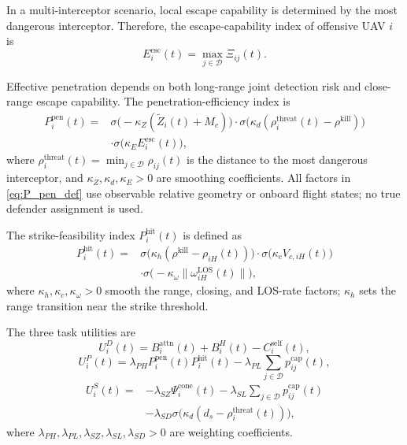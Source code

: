 \documentclass[unbranded]{cja}
\begin{document}
In a multi-interceptor scenario, local escape capability is determined by the most dangerous interceptor. Therefore, the escape-capability index of offensive UAV $i$ is
\begin{equation}
E_i^{\mathrm{esc}}(t)
=
\max_{j\in\mathcal{D}} \Xi_{ij}(t).
\end{equation}

Effective penetration depends on both long-range joint detection risk and close-range escape capability. The penetration-efficiency index is
\begin{equation}
\begin{aligned}
P_i^{\mathrm{pen}}(t)
={}&
\sigma\!\bigl(-\kappa_Z(\widetilde Z_i(t)+M_c)\bigr)
\cdot
\sigma\!\bigl(\kappa_d(\rho_i^{\mathrm{threat}}(t)-\rho^{\mathrm{kill}})\bigr)\\
&\cdot
\sigma\!\bigl(\kappa_E E_i^{\mathrm{esc}}(t)\bigr),
\end{aligned}
\label{eq:P_pen_def}
\end{equation}
where $\rho_i^{\mathrm{threat}}(t)=\min_{j\in\mathcal{D}}\rho_{ij}(t)$ is the distance to the most dangerous interceptor, and $\kappa_Z,\kappa_d,\kappa_E>0$ are smoothing coefficients. All factors in \eqref{eq:P_pen_def} use observable relative geometry or onboard flight states; no true defender assignment is used.

The strike-feasibility index $P_i^{\mathrm{hit}}(t)$ is defined as
\begin{equation}
\begin{aligned}
P_i^{\mathrm{hit}}(t)
={}&
\sigma\!\bigl(\kappa_h(\rho^{\mathrm{kill}}-\rho_{iH}(t))\bigr)
\cdot
\sigma\!\bigl(\kappa_c V_{c,iH}(t)\bigr)\\
&\cdot
\sigma\!\bigl(-\kappa_{\omega}\|\omega_{iH}^{\mathrm{LOS}}(t)\|\bigr),
\end{aligned}
\label{eq:P_hit_def}
\end{equation}
where $\kappa_h,\kappa_c,\kappa_{\omega}>0$ smooth the range, closing, and LOS-rate factors; $\kappa_h$ sets the range transition near the strike threshold.

The three task utilities are
\begin{equation}
U_i^{D}(t)
=B_i^{\mathrm{attn}}(t)+B_i^{H}(t)-C_i^{\mathrm{self}}(t),
\label{eq:role-utility-decoy}
\end{equation}
\begin{equation}
U_i^{P}(t)
=\lambda_{PH}P_i^{\mathrm{pen}}(t)P_i^{\mathrm{hit}}(t)
-\lambda_{PL}\sum_{j\in\mathcal D}p_{ij}^{\mathrm{cap}}(t),
\label{eq:role-utility-pen}
\end{equation}
\begin{equation}
\begin{aligned}
U_i^{S}(t)
={}&-\lambda_{SZ}\Psi_i^{\mathrm{cone}}(t)
-\lambda_{SL}\sum_{j\in\mathcal D}p_{ij}^{\mathrm{cap}}(t)\\
&-\lambda_{SD}\sigma\!\bigl(\kappa_d(d_s-\rho_i^{\mathrm{threat}}(t))\bigr),
\end{aligned}
\label{eq:role-utility-stealth}
\end{equation}
where $\lambda_{PH},\lambda_{PL},\lambda_{SZ},\lambda_{SL},\lambda_{SD}>0$ are weighting coefficients.
\end{document}
